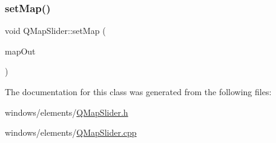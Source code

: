 \subsubsection{\texorpdfstring{set\+Map()}{setMap()}}
{\footnotesize\ttfamily void Q\+Map\+Slider\+::set\+Map (\begin{DoxyParamCaption}\item[{const std\+::map$<$ Q\+Date\+Time, std\+::vector$<$ \hyperlink{class_last_mac}{Last\+Mac} $>$$>$ \&}]{map\+Out }\end{DoxyParamCaption})}



The documentation for this class was generated from the following files\+:\begin{DoxyCompactItemize}
\item 
windows/elements/\hyperlink{_q_map_slider_8h}{Q\+Map\+Slider.\+h}\item 
windows/elements/\hyperlink{_q_map_slider_8cpp}{Q\+Map\+Slider.\+cpp}\end{DoxyCompactItemize}

